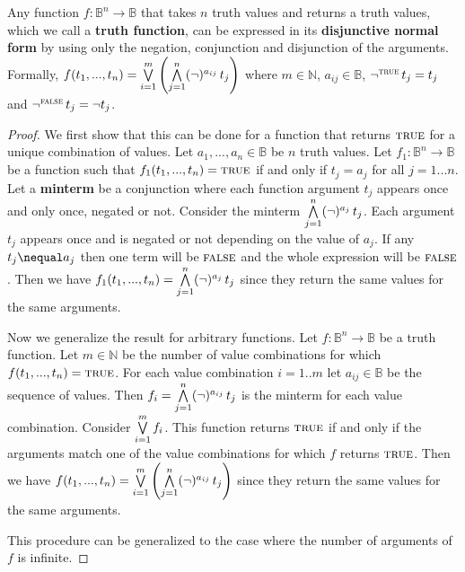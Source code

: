 \documentclass[11pt,letterpaper,fleqn]{memoir} %
\begin{document}
\begin{mathSection}
	\begin{prop}\label{prop_disjunctive_normal_form}
		Any function $f : \mathbb{B}^n \to \mathbb{B}$ that takes $n$ truth values and returns a truth values, which we call a \textbf{truth function}, can be expressed in its \textbf{disjunctive normal form} by using only the negation, conjunction and disjunction of the arguments. Formally, $f(t_1, ..., t_n) =\bigvee \limits_{i=1}^m \left( \bigwedge \limits_{j=1}^n (\neg)^{a_{ij}} \, t_j \right)$ where $m \in \mathbb{N}$, $a_{ij} \in \mathbb{B}$, $\neg ^ {\textsc{true}} \, t_j = t_j$ and $\neg ^ {\textsc{false}} \, t_j = \neg t_j$.
	\end{prop}
	\begin{proof}
		We first show that this can be done for a function that returns $\textsc{true}$ for a unique combination of values. Let $a_1, ..., a_n \in \mathbb{B}$ be $n$ truth values. Let $f_1: \mathbb{B}^n \to \mathbb{B}$ be a function such that $f_1(t_1, ..., t_n) = \textsc{true}$ if and only if $t_j = a_j$ for all $j=1...n$. Let a \textbf{minterm} be a conjunction where each function argument $t_j$ appears once and only once, negated or not. Consider the minterm $\bigwedge \limits_{j=1}^n (\neg)^{a_{j}} \, t_j$. Each argument $t_j$ appears once and is negated or not depending on the value of $a_j$. If any $t_j \nequal a_j$ then one term will be $\textsc{false}$ and the whole expression will be $\textsc{false}$. Then we have $f_1(t_1, ..., t_n) = \bigwedge \limits_{j=1}^n (\neg)^{a_{j}} \, t_j$ since they return the same values for the same arguments.
		
		Now we generalize the result for arbitrary functions. Let $f : \mathbb{B}^n \to \mathbb{B}$ be a truth function. Let $m \in \mathbb{N}$ be the number of value combinations for which $f(t_1, ..., t_n) = \textsc{true}$. For each value combination $i=1..m$ let $a_{ij} \in \mathbb{B}$ be the sequence of values. Then $f_i = \bigwedge \limits_{j=1}^n (\neg)^{a_{ij}} \, t_j$ is the minterm for each value combination. Consider $\bigvee \limits_{i=1}^m f_i$. This function returns $\textsc{true}$ if and only if the arguments match one of the value combinations for which $f$ returns $\textsc{true}$. Then we have $f(t_1, ..., t_n) =\bigvee \limits_{i=1}^m \left( \bigwedge \limits_{j=1}^n (\neg)^{a_{ij}} \, t_j \right)$ since they return the same values for the same arguments.
		
		This procedure can be generalized to the case where the number of arguments of $f$ is infinite.
	\end{proof}
\end{mathSection}
\end{document}
